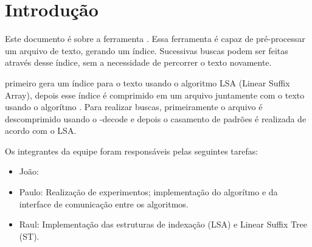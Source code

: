 \section{Introdução}

Este documento é sobre a ferramenta \ipmt. Essa ferramenta é capaz de
pré-processar um arquivo de texto, gerando um índice. Sucessivas buscas podem
ser feitas através desse índice, sem a necessidade de percorrer o texto
novamente.


\ipmt primeiro gera um índice para o texto usando o algoritmo LSA (Linear Suffix
Array), depois esse índice é comprimido em um arquivo juntamente com o texto
usando o algorítmo \lz. Para realizar buscas, primeiramente o arquivo é
descomprimido usando o \lz-decode e depois o casamento de padrões é realizada
de acordo com o LSA.


Os integrantes da equipe foram responsáveis pelas seguintes tarefas:
\begin{itemize}
\item João: 

\item Paulo: Realização de experimentos; implementação do algorítmo \lz e da
interface de comunicação entre os algoritmos.

\item Raul: Implementação das estruturas de indexação \lsa (LSA) e Linear Suffix Tree (ST).

\end{itemize}

